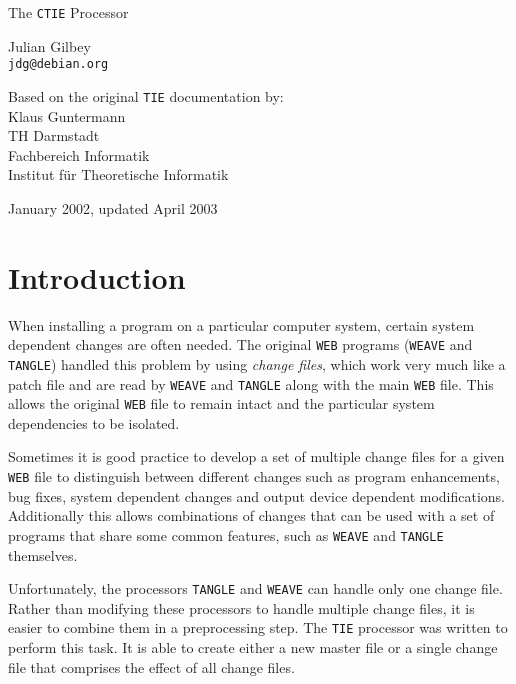 \documentclass{article}
\let\.=\texttt
\begin{document}
\begin{center}
\Large The \.{CTIE} Processor

\bigskip
\large
Julian Gilbey\\
\.{jdg@debian.org}

\bigskip
Based on the original \.{TIE} documentation by:\\
Klaus Guntermann\\
TH Darmstadt\\
Fachbereich Informatik\\
Institut f\"ur Theoretische Informatik

\bigskip
January 2002, updated April 2003

\end{center}

\bigskip

\section{Introduction}

When installing a program on a particular computer system, certain
system dependent changes are often needed.  The original \.{WEB}
programs (\.{WEAVE} and \.{TANGLE}) handled this problem by using
\textit{change files}, which work very much like a patch file and are
read by \.{WEAVE} and \.{TANGLE} along with the main \.{WEB} file.
This allows the original \.{WEB} file to remain intact and the
particular system dependencies to be isolated.

Sometimes it is good practice to develop a set of multiple change
files for a given \.{WEB} file to distinguish between different
changes such as program enhancements, bug fixes, system dependent
changes and output device dependent modifications.  Additionally this
allows combinations of changes that can be used with a set of programs
that share some common features, such as \.{WEAVE} and \.{TANGLE}
themselves.

Unfortunately, the processors \.{TANGLE} and \.{WEAVE} can handle only
one change file.  Rather than modifying these processors to handle
multiple change files, it is easier to combine them in a preprocessing
step.  The \.{TIE} processor was written to perform this task.  It is
able to create either a new master file or a single change file that
comprises the effect of all change files.
\end{document}
